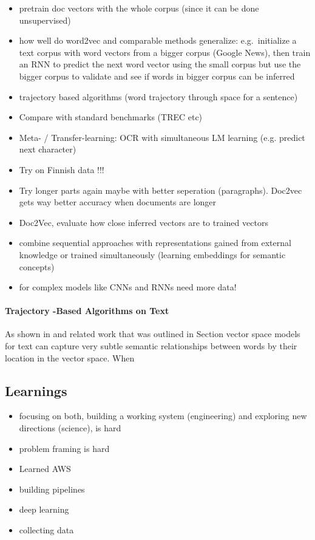 \begin{itemize}
	\item pretrain doc vectors with the whole corpus (since it can be done unsupervised)
  \item how well do word2vec and comparable methods generalize: e.g.\ initialize a text corpus with word vectors from a bigger corpus (Google News), then train an RNN to predict the next word vector using the small corpus but use the bigger corpus to validate and see if words in bigger corpus can be inferred
  \item trajectory based algorithms (word trajectory through space for a sentence)
  \item Compare with standard benchmarks (TREC etc)
  \item Meta- / Transfer-learning: OCR with simultaneous LM learning (e.g. predict next character)
  \item Try on Finnish data !!!
  \item Try longer parts again maybe with better seperation (paragraphs). Doc2vec gets way better accuracy when documents are longer
  \item Doc2Vec, evaluate how close inferred vectors are to trained vectors
  \item combine sequential approaches with representations gained from external knowledge or trained simultaneously (learning embeddings for semantic concepts)
  \item for complex models like CNNs and RNNs need more data!
  \
\end{itemize}


\paragraph{Trajectory -Based Algorithms on Text}
\label{par:Trajectory Algorithms on Text}
As shown in \cite{Mikolov:2013ac} and related work that was outlined in Section vector space models for text can capture very subtle semantic relationships between words by their location in the vector space. When


\subsection{Learnings}
\label{sub:learnings}

\begin{itemize}
  \item focusing on both, building a working system (engineering) and exploring new directions (science), is hard
  \item problem framing is hard
  \item Learned AWS
  \item building pipelines
  \item deep learning
  \item collecting data
\end{itemize}
